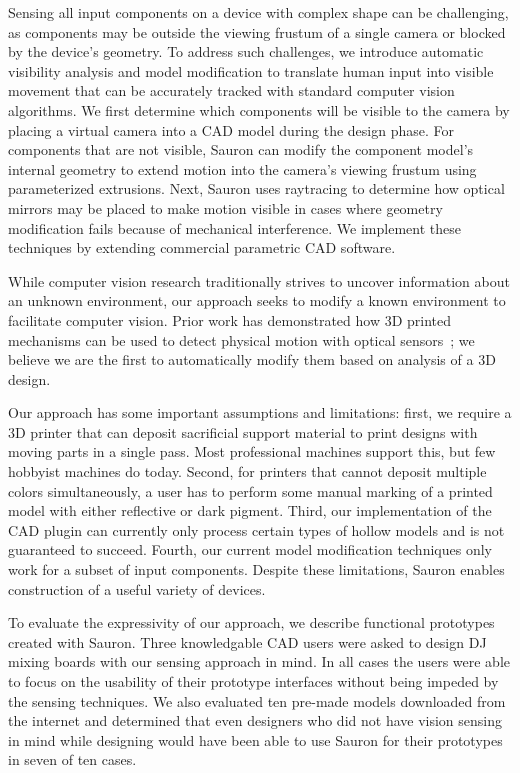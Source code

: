 Sensing all input components on a device with complex shape can be challenging, as components may be outside the viewing frustum of a single camera or blocked by the device's geometry. To address such challenges, we introduce automatic visibility analysis and model modification 
to translate human input into visible movement that can be accurately tracked with standard computer vision algorithms. We first determine which components will be visible to the camera by placing a virtual camera into a CAD model during the design phase. For components that are not visible, Sauron can modify the component model's internal geometry to extend motion into the camera's viewing frustum using parameterized extrusions. Next, Sauron uses raytracing to determine how optical mirrors may be placed to make motion visible in cases where geometry modification fails because of mechanical interference. We implement these techniques by extending commercial parametric CAD software.

While computer vision research traditionally strives to uncover information about an unknown environment, our approach seeks to modify a known environment to facilitate computer vision. Prior work has demonstrated how 3D printed mechanisms can be used to detect physical motion with optical sensors~\cite{willis-printedoptics}; we believe we are the first to automatically modify them based on analysis of a 3D design.

Our approach has some important assumptions and limitations: first, we require a 3D printer that can deposit sacrificial support material to print designs with moving parts in a single pass. Most professional machines support this, but few hobbyist machines do today. Second, for printers that cannot deposit multiple colors simultaneously, a user has to perform some manual marking of a printed model with either reflective or dark pigment. Third, our implementation of the CAD plugin can currently only process certain types of hollow models and is not guaranteed to succeed. Fourth, our current model modification techniques only work for a subset of input components. Despite these limitations, Sauron enables construction of a useful variety of devices.

To evaluate the expressivity of our approach, we describe functional prototypes created with Sauron. 
Three knowledgable CAD users were asked to %
design DJ mixing boards with our sensing approach in mind.  In all cases the users were able to focus on the usability of their prototype interfaces without being impeded by the sensing techniques.  We also evaluated ten pre-made models downloaded from the internet and determined that even designers who did not have vision sensing in mind while designing would have been able to use Sauron for their prototypes in seven of ten cases.

